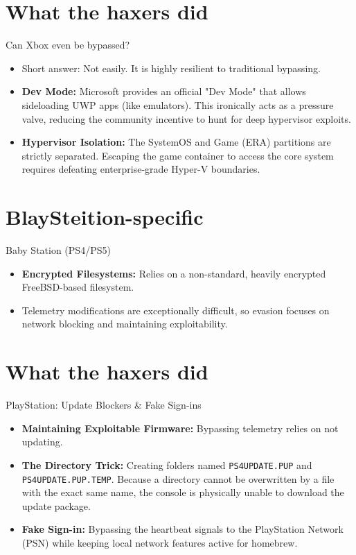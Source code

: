 \documentclass[aspectratio=169]{beamer}
\begin{document}
\section{What the haxers did}

\begin{frame}{Can Xbox even be bypassed?}
    \begin{itemize}
        \item Short answer: Not easily. It is highly resilient to traditional bypassing.
        \item \textbf{Dev Mode:} Microsoft provides an official "Dev Mode" that allows sideloading UWP apps (like emulators). This ironically acts as a pressure valve, reducing the community incentive to hunt for deep hypervisor exploits.
        \item \textbf{Hypervisor Isolation:} The SystemOS and Game (ERA) partitions are strictly separated. Escaping the game container to access the core system requires defeating enterprise-grade Hyper-V boundaries.
    \end{itemize}
\end{frame}

\section{BlaySteition-specific}

\begin{frame}{Baby Station (PS4/PS5)}
    \begin{itemize}
        \item \textbf{Encrypted Filesystems:} Relies on a non-standard, heavily encrypted FreeBSD-based filesystem.
        \item Telemetry modifications are exceptionally difficult, so evasion focuses on network blocking and maintaining exploitability.
    \end{itemize}
\end{frame}

\section{What the haxers did}

\begin{frame}{PlayStation: Update Blockers \& Fake Sign-ins}
    \begin{itemize}
        \item \textbf{Maintaining Exploitable Firmware:} Bypassing telemetry relies on not updating.
        \item \textbf{The Directory Trick:} Creating folders named \texttt{PS4UPDATE.PUP} and \texttt{PS4UPDATE.PUP.TEMP}. Because a directory cannot be overwritten by a file with the exact same name, the console is physically unable to download the update package.
        \item \textbf{Fake Sign-in:} Bypassing the heartbeat signals to the PlayStation Network (PSN) while keeping local network features active for homebrew.
    \end{itemize}
\end{frame}



\end{document}
